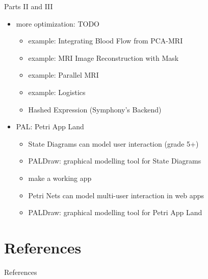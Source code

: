 \documentclass[presentation]{beamer}
\begin{document}
\begin{frame}{Parts II and III}
  \begin{itemize}
  \item more optimization: TODO
  \begin{itemize}
  \item example: Integrating Blood Flow from PCA-MRI
  \item example: MRI Image Reconstruction with Mask
  \item example: Parallel MRI
  \item example: Logistics
  \item Hashed Expression (Symphony's Backend)
  \end{itemize}
  \item PAL:  Petri App Land
  \begin{itemize}
  \item State Diagrams can model user interaction (grade 5+)
  \item PALDraw:  graphical modelling tool for State Diagrams
  \item make a working app
  \item Petri Nets can model multi-user interaction in web apps
  \item PALDraw:  graphical modelling tool for Petri App Land
  \end{itemize}
  \end{itemize}
\end{frame}

\section{References}
\label{sec:org51a8b04}
\begin{frame}[label={sec:org2b02857}]{References}
\printbibliography[heading=none]
\end{frame}
\end{document}
